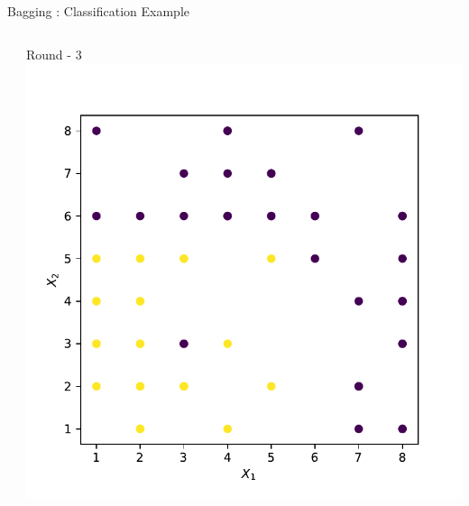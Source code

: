 \documentclass[aspectratio=169,10pt]{beamer}
\newcommand{\fitpic}[1]{\begin{adjustbox}{max width=\linewidth, max totalheight=0.78\textheight}#1\end{adjustbox}}
\begin{document}
\begin{frame}{Bagging : Classification Example}
\begin{columns}
\begin{column}{0.33\textwidth}
    \end{column}
    \pause\begin{column}{0.33\textwidth}\centering
      Round - 3\\
      \fitpic{\includegraphics[width=\linewidth]{../assets/ensemble/figures/dataset-rnd-2}}
    \end{column}
  \end{columns}


\end{frame}
\end{document}

